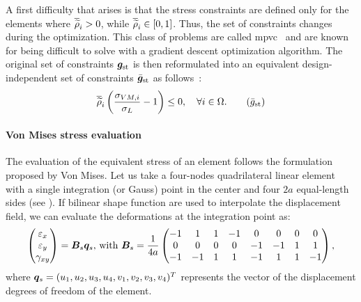 A first difficulty that arises is that the stress constraints are defined only for the elements where $\overline{\widetilde{\rho}}_i > 0$, while $\overline{\widetilde{\rho}}_i\in[0,1]$. Thus, the set of constraints changes during the optimization. This class of problems are called \acrfull{mpvc}~ and are known for being difficult to solve with a gradient descent optimization algorithm. The original set of constraints $\bm{g}_{\text{st}}$ is then reformulated into an equivalent design-independent set of constraints $\bar{\bm{g}}_{\text{st}}$ as follows~:
\begin{equation}
    \rhophys_i\left(\frac{ \sigma_{VM,i}}{\sigma_L}-1 \right) \leq 0, \quad \forall i \in \Omega.
    \tag{$\bar{g}_{\text{st}}$}
\end{equation}

\paragraph{Von Mises stress evaluation}
The evaluation of the equivalent stress of an element follows the formulation proposed by Von Mises. Let us take a four-nodes quadrilateral linear element with a single integration (or Gauss) point in the center and four $2a$ equal-length sides (see ). If bilinear shape function are used to interpolate the displacement field, we can evaluate the deformations at the integration point as:
\begin{equation}
    \begin{pmatrix}
    \varepsilon_x \\
    \varepsilon_y \\
    \gamma_{xy}
    \end{pmatrix} = \bm{B}_s\bm{q}_s
    \textrm{,  with }
    \bm{B}_s =
    \frac{1}{4a}
    \begin{pmatrix}
    -1  &   1   &   1   &   -1  &   0   &   0   &   0   &   0   \\
    0   &   0   &   0   &   0   &   -1  &   -1  &   1   &   1   \\
    -1  &   -1  &   1   &   1   &   -1  &   1   &   1   &   -1
    \end{pmatrix},
\end{equation}
where $\bm{q}_s = (u_1, u_2, u_3, u_4, v_1, v_2, v_3, v_4)^T$ represents the vector of the displacement degrees of freedom of the element. 

